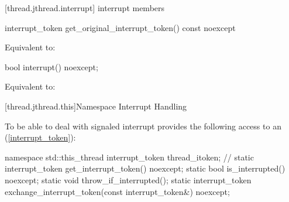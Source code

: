 [thread.jthread.interrupt]{ interrupt members}

{\color{insertnote}
%
\begin{itemdecl}
interrupt_token get_original_interrupt_token() const noexcept
\end{itemdecl}
\begin{itemdescr}
  \pnum\effects Equivalent to: 
\end{itemdescr}

%
\begin{itemdecl}
bool interrupt() noexcept;
\end{itemdecl}
\begin{itemdescr}
  \pnum\effects Equivalent to: 
\end{itemdescr}
}%

%
%
%

[thread.jthread.this]{Namespace  Interrupt Handling}

To be able to deal with signaled interrupt
 provides the following access to an  (\ref{interrupt_token}):

\begin{codeblock}
namespace std::this_thread {
  interrupt_token thread_itoken;                 // \expos
  static interrupt_token get_interrupt_token() noexcept;
  static bool is_interrupted() noexcept;
  static void throw_if_interrupted();
  static interrupt_token exchange_interrupt_token(const interrupt_token&) noexcept;
}
\end{codeblock}

